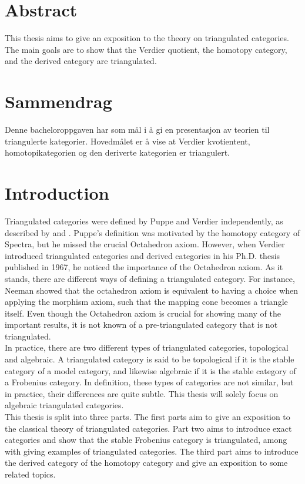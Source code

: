 \chapter*{Abstract}
    This thesis aims to give an exposition to the theory on triangulated categories. The main goals are to show that the Verdier quotient, the homotopy category, and the derived category are triangulated.

\chapter*{Sammendrag}
    Denne bacheloroppgaven har som mål i å gi en presentasjon av teorien til triangulerte kategorier. Hovedmålet er å vise at Verdier kvotientent, homotopikategorien og den deriverte kategorien er triangulert.

\chapter*{Introduction}

    Triangulated categories were defined by Puppe and Verdier independently, as described by \cite{Kra21} and \cite{neeman}. Puppe's definition was motivated by the homotopy category of Spectra, but he missed the crucial Octahedron axiom. However, when Verdier introduced triangulated categories and derived categories in his Ph.D. thesis published in 1967, he noticed the importance of the Octahedron axiom. As it stands, there are different ways of defining a triangulated category. For instance, Neeman showed that the octahedron axiom is equivalent to having a choice when applying the morphism axiom, such that the mapping cone becomes a triangle itself. Even though the Octahedron axiom is crucial for showing many of the important results, it is not known of a pre-triangulated category that is not triangulated. \\
    
    In practice, there are two different types of triangulated categories, topological and algebraic. A triangulated category is said to be topological if it is the stable category of a model category, and likewise algebraic if it is the stable category of a Frobenius category. In definition, these types of categories are not similar, but in practice, their differences are quite subtle. This thesis will solely focus on algebraic triangulated categories. \\

    This thesis is split into three parts. The first parts aim to give an exposition to the classical theory of triangulated categories. Part two aims to introduce exact categories and show that the stable Frobenius category is triangulated, among with giving examples of triangulated categories. The third part aims to introduce the derived category of the homotopy category and give an exposition to some related topics. \\

